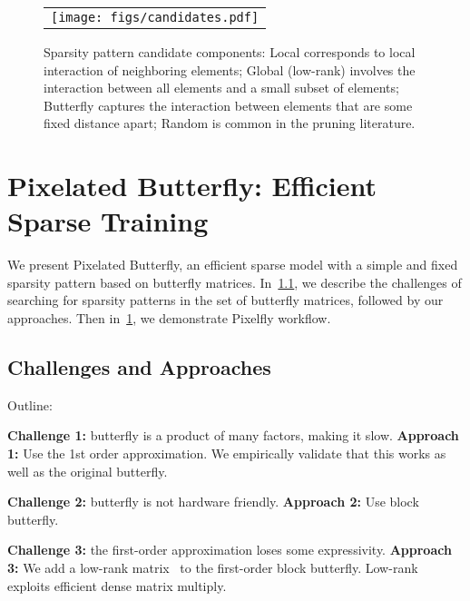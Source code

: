 \begin{figure}[t]
	\vspace{-0.5cm}
	\begin{center}
	\scriptsize
		\begin{tabular}{c}
			\texttt{[image: figs/candidates.pdf]}
		\end{tabular}
	\end{center}
	\vspace{-0.5cm}
	\caption{Sparsity pattern candidate components:  Local corresponds to local interaction of neighboring elements; Global (low-rank) involves the interaction between all elements and a small subset of elements; Butterfly captures the interaction between elements that are some fixed distance apart; Random is common in the pruning literature.}
	\label{fig:block_sparse_visualization} 
\end{figure}

\section{Pixelated Butterfly: Efficient Sparse Training}
\label{sec:algorithm}
We present Pixelated Butterfly, an efficient sparse model with a simple and fixed sparsity pattern based on butterfly matrices.
In~\cref{sec:challenges}, we describe the challenges of searching for sparsity patterns in the set of butterfly matrices, followed by our approaches.
Then in~\cref{sec:algorithm}, we demonstrate Pixelfly workflow.

\subsection{Challenges and Approaches}
\label{sec:challenges}

Outline:

\textbf{Challenge 1:} butterfly is a product of many factors, making it slow.
\textbf{Approach 1:} Use the 1st order approximation. We empirically validate that this works as well as the original butterfly.

\textbf{Challenge 2:} butterfly is not hardware friendly.
\textbf{Approach 2:} Use block butterfly.

\textbf{Challenge 3:} the first-order approximation loses some expressivity.
\textbf{Approach 3:} We add a low-rank matrix~\citep{udell2019big} to the first-order block butterfly.
Low-rank exploits efficient dense matrix multiply.


































